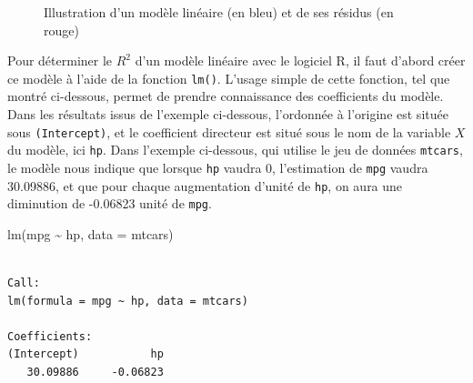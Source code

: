 \documentclass[
  letterpaper,
]{book}
\newenvironment{Shaded}{\begin{snugshade}}{\end{snugshade}}
\newcommand{\AttributeTok}[1]{\textcolor[rgb]{0.40,0.45,0.13}{#1}}
\newcommand{\FunctionTok}[1]{\textcolor[rgb]{0.28,0.35,0.67}{#1}}
\newcommand{\NormalTok}[1]{\textcolor[rgb]{0.00,0.23,0.31}{#1}}
\newcommand{\SpecialCharTok}[1]{\textcolor[rgb]{0.37,0.37,0.37}{#1}}
\begin{document}
\begin{figure}


\caption{\label{fig-graphsee}Illustration d'un modèle linéaire (en bleu)
et de ses résidus (en rouge)}

\end{figure}%

Pour déterminer le \(R^2\) d'un modèle linéaire avec le logiciel R, il
faut d'abord créer ce modèle à l'aide de la fonction \texttt{lm()}.
L'usage simple de cette fonction, tel que montré ci-dessous, permet de
prendre connaissance des coefficients du modèle. Dans les résultats
issus de l'exemple ci-dessous, l'ordonnée à l'origine est située sous
\texttt{(Intercept)}, et le coefficient directeur est situé sous le nom
de la variable \(X\) du modèle, ici \texttt{hp}. Dans l'exemple
ci-dessous, qui utilise le jeu de données \texttt{mtcars}, le modèle
nous indique que lorsque \texttt{hp} vaudra 0, l'estimation de
\texttt{mpg} vaudra 30.09886, et que pour chaque augmentation d'unité de
\texttt{hp}, on aura une diminution de -0.06823 unité de \texttt{mpg}.

\begin{Shaded}
\begin{Highlighting}[]
\FunctionTok{lm}\NormalTok{(mpg }\SpecialCharTok{\textasciitilde{}}\NormalTok{ hp, }\AttributeTok{data =}\NormalTok{ mtcars)}
\end{Highlighting}
\end{Shaded}

\begin{verbatim}

Call:
lm(formula = mpg ~ hp, data = mtcars)

Coefficients:
(Intercept)           hp  
   30.09886     -0.06823  
\end{verbatim}
\end{document}

